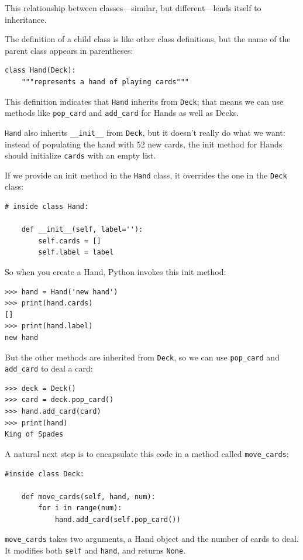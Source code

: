 \documentclass[10pt]{book}
\begin{document}
This relationship between classes---similar, but different---lends
itself to inheritance.  

The definition of a child class is like other class definitions,
but the name of the parent class appears in parentheses:


\beforeverb
\begin{verbatim}
class Hand(Deck):
    """represents a hand of playing cards"""
\end{verbatim}
\afterverb
%
This definition indicates that {\tt Hand} inherits from {\tt Deck};
that means we can use methods like \verb"pop_card" and \verb"add_card"
for Hands as well as Decks.

{\tt Hand} also inherits \verb"__init__" from {\tt Deck}, but
it doesn't really do what we want: instead of populating the hand
with 52 new cards, the init method for Hands should initialize
{\tt cards} with an empty list.


If we provide an init method in the {\tt Hand} class, it overrides the
one in the {\tt Deck} class:

\beforeverb
\begin{verbatim}
# inside class Hand:

    def __init__(self, label=''):
        self.cards = []
        self.label = label
\end{verbatim}
\afterverb
%
So when you create a Hand, Python invokes this init method:

\beforeverb
\begin{verbatim}
>>> hand = Hand('new hand')
>>> print(hand.cards)
[]
>>> print(hand.label)
new hand
\end{verbatim}
\afterverb
%
But the other methods are inherited from {\tt Deck}, so we can use
\verb"pop_card" and \verb"add_card" to deal a card:

\beforeverb
\begin{verbatim}
>>> deck = Deck()
>>> card = deck.pop_card()
>>> hand.add_card(card)
>>> print(hand)
King of Spades
\end{verbatim}
\afterverb
%
A natural next step is to encapsulate this code in a method
called \verb"move_cards":


\beforeverb
\begin{verbatim}
#inside class Deck:

    def move_cards(self, hand, num):
        for i in range(num):
            hand.add_card(self.pop_card())
\end{verbatim}
\afterverb
%
\verb"move_cards" takes two arguments, a Hand object and the number of
cards to deal.  It modifies both {\tt self} and {\tt hand}, and
returns {\tt None}.
\end{document}
